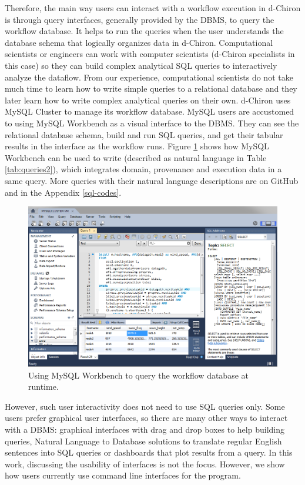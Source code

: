 Therefore, the main way users can interact with a workflow execution in
d-Chiron is through query interfaces, generally provided by the DBMS, to
query the workflow database. It helps to run the queries when the user understands the database schema that logically organizes data in
d-Chiron. Computational scientists or engineers can work with computer scientists
(d-Chiron specialists in this case) so they can build complex analytical SQL
queries to interactively analyze the dataflow. From our experience,
computational scientists do not take much time to learn how to write
simple queries to a relational database and they later learn how to
write complex analytical queries on their own. d-Chiron uses MySQL
Cluster to manage its workflow database. MySQL users are accustomed to using
MySQL Workbench as a visual interface to the DBMS. They can see the
relational database schema, build and run SQL queries, and get their
tabular results in the interface as the workflow runs. Figure \ref{fig:mysql_workbench} shows
how MySQL Workbench can be used to write  (described as natural language in Table \ref{tab:queries2}), which integrates domain, provenance
and execution data in a same query. More queries with their natural
language descriptions are on GitHub \cite{d-ChironGitHub} and in the Appendix \ref{sql-codes}.

\begin{figure}
    \centering
   \includegraphics[width=\textwidth,keepaspectratio]{img/mysql_workbench.png}
    \caption{Using MySQL Workbench to query the workflow database at runtime.}
    \label{fig:mysql_workbench}
\end{figure}


However, such user interactivity does not need to use SQL queries only. Some
users prefer graphical user interfaces, so there are many other ways to
interact with a DBMS: graphical interfaces with drag and drop boxes to
help building queries, Natural Language to Database solutions to
translate regular English sentences into SQL queries or dashboards that
plot results from a query. 
In this work, discussing the
usability of interfaces is not the focus. However, we show how
users currently use command line interfaces for the  program.


